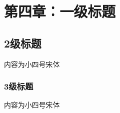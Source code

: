  \setlength{\baselineskip}{20pt}
\chapter{第四章：一级标题}
\label{cha:chap4}



\section{2级标题}
内容为小四号宋体


\subsection{3级标题}
内容为小四号宋体